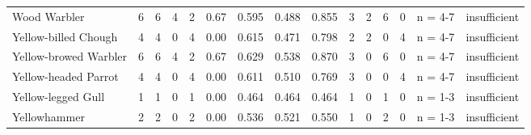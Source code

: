 \begin{landscape}
\begin{longtable}{L{3.6cm}*{12}{C{0.90cm}}L{1.45cm}L{1.65cm}}
Wood Warbler & 6 & 6 & 4 & 2 & 0.67 & 0.595 & 0.488 & 0.855 & 3 & 2 & 6 & 0 & n = 4-7 & insufficient \\
Yellow-billed Chough & 4 & 4 & 0 & 4 & 0.00 & 0.615 & 0.471 & 0.798 & 2 & 2 & 0 & 4 & n = 4-7 & insufficient \\
Yellow-browed Warbler & 6 & 6 & 4 & 2 & 0.67 & 0.629 & 0.538 & 0.870 & 3 & 0 & 6 & 0 & n = 4-7 & insufficient \\
Yellow-headed Parrot & 4 & 4 & 0 & 4 & 0.00 & 0.611 & 0.510 & 0.769 & 3 & 0 & 0 & 4 & n = 4-7 & insufficient \\
Yellow-legged Gull & 1 & 1 & 0 & 1 & 0.00 & 0.464 & 0.464 & 0.464 & 1 & 0 & 1 & 0 & n = 1-3 & insufficient \\
Yellowhammer & 2 & 2 & 0 & 2 & 0.00 & 0.536 & 0.521 & 0.550 & 1 & 0 & 2 & 0 & n = 1-3 & insufficient \\
\end{longtable}
\end{landscape}
